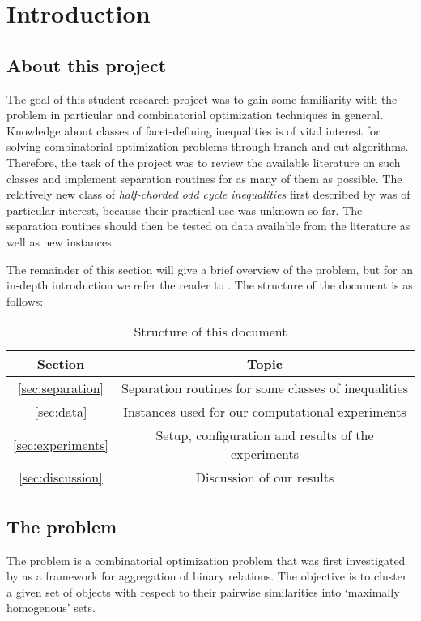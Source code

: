 \section{Introduction}
\subsection{About this project}\label{subsec:about}
The goal of this student research project was to gain some familiarity with the \CP problem in particular and combinatorial optimization techniques in general.
Knowledge about classes of facet-defining inequalities is of vital interest for solving combinatorial optimization problems through branch-and-cut algorithms.
Therefore, the task of the project was to review the available literature on such classes and implement separation routines for as many of them as possible.
The relatively new class of \textit{half-chorded odd cycle inequalities} first described by \cite{andresPolyhedralStudyLifted2022} was of particular interest, because their practical use was unknown so far.
The separation routines should then be tested on data available from the literature as well as new instances.

The remainder of this section will give a brief overview of the \CP problem, but for an in-depth introduction we refer the reader to \cite{grotschelFacetsCliquePartitioning1990}.
The structure of the document is as follows:
\begin{table}[h]
	\centering
	\begin{tabular}{||c|c||}
		\hline
		Section & Topic \\ [0.5ex]
		\hline\hline
		\cref{sec:separation}& Separation routines for some classes of inequalities \\
		\cref{sec:data}& Instances used for our computational experiments \\
		\cref{sec:experiments}& Setup, configuration and results of the experiments \\
		\cref{sec:discussion}& Discussion of our results \\
		\hline
	\end{tabular}
	\caption{Structure of this document}
\end{table}

\subsection{The \CP problem}\label{subsec:cp_problem}
The \CP problem is a combinatorial optimization problem that was first investigated by \cite{grotschelFacetsCliquePartitioning1990} as a framework for aggregation of binary relations.
The objective is to cluster a given set of objects with respect to their pairwise similarities into ‘maximally homogenous’ sets.

